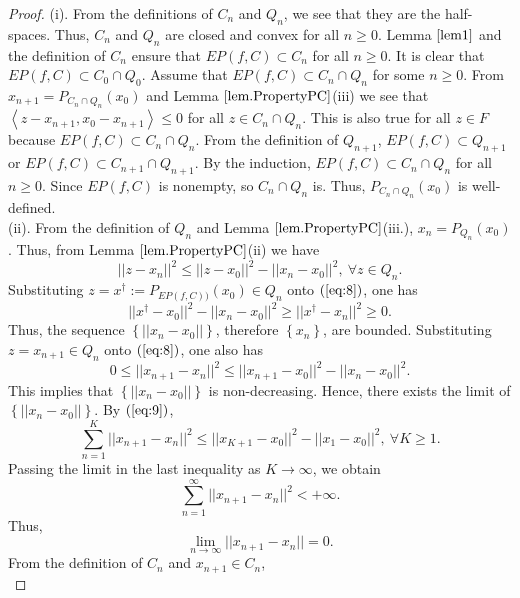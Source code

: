 \documentclass{aims}
\theoremstyle{definition}
\begin{document}
\begin{proof}
(i). From the definitions of $C_n$ and $Q_n$, we see that they are the half-spaces. Thus, $C_n$ and $Q_n$ 
are closed and convex for all $n\ge 0$. Lemma $\ref{lem1}$ and the definition of $C_n$ ensure that $EP(f,C)\subset C_n$ for all $n\ge 0$. 
It is clear that $EP(f,C)\subset C_0\cap Q_0$. Assume that $EP(f,C)\subset C_n\cap Q_n$ for some $n\ge 0$. From $x_{n+1}=P_{C_n\cap Q_n}(x_0)$ 
and Lemma $\ref{lem.PropertyPC}$(iii) we see that $\left\langle z-x_{n+1},x_0-x_{n+1}\right\rangle\le 0$ for all $z\in C_n\cap Q_n$. This 
is also true for all $z\in F$ because $EP(f,C)\subset C_n\cap Q_n$. From the definition of $Q_{n+1}$, $EP(f,C)\subset Q_{n+1}$ or 
$EP(f,C)\subset C_{n+1}\cap Q_{n+1}$. By the induction, $EP(f,C)\subset C_n\cap Q_n$ for all $n\ge 0$. Since $EP(f,C)$ is nonempty, so $C_n\cap Q_n$ is. 
Thus, $P_{C_n\cap Q_n}(x_0)$ is well-defined.\\
(ii). From the definition of $Q_n$ and Lemma $\ref{lem.PropertyPC}$(iii.), $x_n=P_{Q_n}(x_0)$. Thus, from Lemma $\ref{lem.PropertyPC}$(ii) we have
\begin{equation}\label{eq:8}
||z-x_n||^2\le||z-x_0||^2-||x_n-x_0||^2,~\forall z\in Q_n.
\end{equation}
Substituting $z=x^\dagger:=P_{EP(f,C))}(x_0)\in Q_n$ onto $(\ref{eq:8})$, one has 
\begin{equation}\label{eq:8*}
||x^\dagger-x_0||^2-||x_n-x_0||^2\ge ||x^\dagger-x_n||^2\ge 0.
\end{equation}
Thus, the sequence $\left\{||x_n-x_0||\right\}$, therefore $\left\{x_n\right\}$, are bounded. Substituting $z=x_{n+1}\in Q_n$ onto $(\ref{eq:8})$, one also has 
\begin{equation}\label{eq:9}
0\le||x_{n+1}-x_n||^2\le||x_{n+1}-x_0||^2-||x_n-x_0||^2.
\end{equation}
This implies that $\left\{||x_n-x_0||\right\}$ is non-decreasing. Hence, there exists the limit of $\left\{||x_n-x_0||\right\}$. 
By $(\ref{eq:9})$, 
$$
\sum_{n=1}^K||x_{n+1}-x_n||^2\le ||x_{K+1}-x_0||^2-||x_1-x_0||^2,~\forall K\ge 1.
$$
Passing the limit in the last inequality as $K\to\infty$, we obtain
\begin{equation}\label{eq:10*}
\sum_{n=1}^\infty||x_{n+1}-x_n||^2<+\infty.
\end{equation}
Thus,
\begin{equation}\label{eq:11*}
\lim_{n\to\infty}||x_{n+1}-x_n||=0.
\end{equation}
From the definition of $C_n$ and $x_{n+1}\in C_n$,
\begin{equation}\label{eq:12}

\end{equation}
\end{proof}
\end{document}
